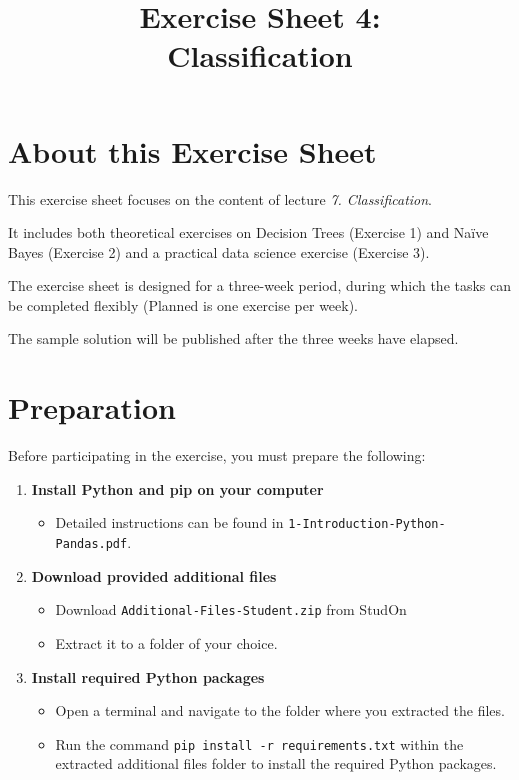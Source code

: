 \documentclass[
english,
smallborders
]{i6prcsht}
\begin{document}
\title{Exercise Sheet 4: \\ Classification}
\maketitle
\vspace*{-2cm}

\section*{About this Exercise Sheet}

This exercise sheet focuses on the content of lecture \textit{7. Classification}.

It includes both theoretical exercises on Decision Trees (Exercise 1) and Naïve Bayes (Exercise 2) and a practical data science exercise (Exercise 3).

The exercise sheet is designed for a three-week period, during which the tasks can be completed flexibly (Planned is one exercise per week).

The sample solution will be published after the three weeks have elapsed.

\section*{Preparation}

Before participating in the exercise, you must prepare the following:

\begin{enumerate}
	\item \textbf{Install Python and pip on your computer}
	      
	      \begin{itemize}
		      \item Detailed instructions can be found in \texttt{1-Introduction-Python-Pandas.pdf}.
	      \end{itemize}
	      
	\item \textbf{Download provided additional files}
	      
	      \begin{itemize}
		      \item Download \texttt{Additional-Files-Student.zip} from StudOn
		      \item Extract it to a folder of your choice.
	      \end{itemize}
	      
	\item \textbf{Install required Python packages}
	      
	      \begin{itemize}
		      \item Open a terminal and navigate to the folder where you extracted the files.
		      \item Run the command \texttt{pip install -r requirements.txt} within the extracted additional files folder to install the required Python packages.
	      \end{itemize}
	      
	      
\end{enumerate}
\end{document}
